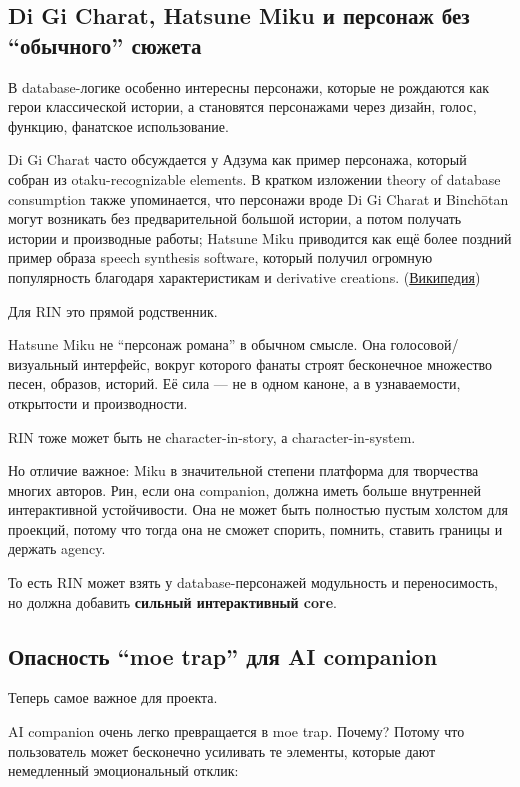 \subsection*{Di Gi Charat, Hatsune Miku и персонаж без ``обычного''
сюжета}

В database-логике особенно интересны персонажи, которые не рождаются как
герои классической истории, а становятся персонажами через дизайн,
голос, функцию, фанатское использование.

Di Gi Charat часто обсуждается у Адзума как пример персонажа, который
собран из otaku-recognizable elements. В кратком изложении theory of
database consumption также упоминается, что персонажи вроде Di Gi Charat
и Binchōtan могут возникать без предварительной большой истории, а потом
получать истории и производные работы; Hatsune Miku приводится как ещё
более поздний пример образа speech synthesis software, который получил
огромную популярность благодаря характеристикам и derivative creations.
(\href{https://en.wikipedia.org/wiki/Database_consumption?utm_source=chatgpt.com}{Википедия})

Для RIN это прямой родственник.

Hatsune Miku не ``персонаж романа'' в обычном смысле. Она
голосовой/\hspace{0pt}визуальный интерфейс, вокруг которого фанаты строят
бесконечное множество песен, образов, историй. Её сила --- не в одном
каноне, а в узнаваемости, открытости и производности.

RIN тоже может быть не character-in-story, а character-in-system.

Но отличие важное: Miku в значительной степени платформа для творчества
многих авторов. Рин, если она companion, должна иметь больше внутренней
интерактивной устойчивости. Она не может быть полностью пустым холстом
для проекций, потому что тогда она не сможет спорить, помнить, ставить
границы и держать agency.

То есть RIN может взять у database-персонажей модульность и
переносимость, но должна добавить \textbf{сильный интерактивный core}.

\subsection*{Опасность ``moe trap'' для AI companion}

Теперь самое важное для проекта.

AI companion очень легко превращается в moe trap. Почему? Потому что
пользователь может бесконечно усиливать те элементы, которые дают
немедленный эмоциональный отклик:


